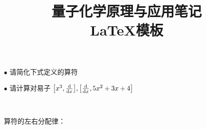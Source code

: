 \documentclass[11pt,a4paper,onecolumn]{article}
\begin{document}
\title{%
  \heiti \huge \vspace{-50pt} 量子化学原理与应用笔记 \\ \LaTeX 模板}

  \maketitle
\vspace{-10pt}




\begin{exercise}{1}
	
$ \bullet $
请简化下式定义的算符 

$ \bullet $
请计算对易子 $ \qty[x^3, \dv{x}], \qty[\dv{x}, 5x^2+3x+4] $
\end{exercise}


\begin{solution}
   \lipsum[3]
  
  \begin{warning}
    
  \end{warning}
 
  \tcbline
  \lipsum[4]
\end{solution}

\vspace{30pt}~\\

\begin{exercise}{2}
	算符的左右分配律：
\end{exercise}

\begin{solution}
\lipsum[5]
\end{solution}

\vspace{30pt}~\\
\end{document}
